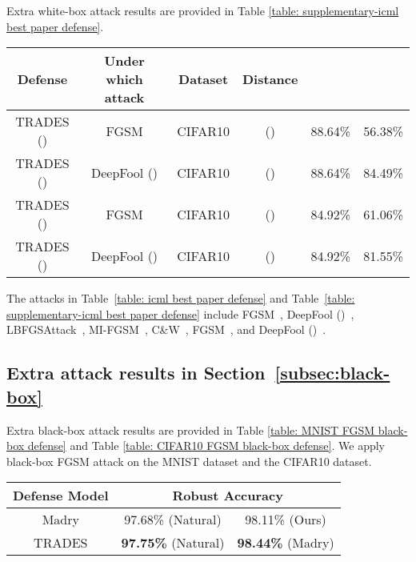 \documentclass[11pt]{article}
\newcommand{\0}{\mathbf{0}}
\newcommand{\1}{\mathbf{1}}
\begin{document}
Extra white-box attack results are provided in Table \ref{table: supplementary-icml best paper defense}.

\begin{table*}[ht]
	\caption{Results of our method TRADES under different white-box attacks.}
	\label{table: supplementary-icml best paper defense}
	\centering
\begin{tabular}{c||c|c|c|c|c}\hline
		Defense & Under which attack & Dataset & Distance &    &   
		\\
		\hline
		{TRADES} () & FGSM  & CIFAR10 &   () & 88.64\% & 56.38\% \\
{TRADES} () & DeepFool ()  & CIFAR10 &   () & 88.64\% & 84.49\% \\
\hline
		{TRADES} () & FGSM  & CIFAR10 &   () & 84.92\% & 61.06\% \\
{TRADES} ()  & DeepFool () & CIFAR10 &   () & 84.92\% & 81.55\% \\
\hline
	\end{tabular}
\end{table*}

The attacks in Table~\ref{table: icml best paper defense} and Table~\ref{table: supplementary-icml best paper defense} include FGSM~\cite{kurakin2016adversarial}, DeepFool ()~\cite{moosavi2016deepfool},  LBFGSAttack~\cite{tabacof2016exploring}, MI-FGSM~\cite{dong2018boosting}, C\&W~\cite{carlini2017towards}, FGSM~\cite{kurakin2016adversarial}, and DeepFool ()~\cite{moosavi2016deepfool}.

\subsection{Extra attack results in Section~\ref{subsec:black-box}}
Extra black-box attack results are provided in Table \ref{table: MNIST FGSM black-box defense} and Table \ref{table: CIFAR10 FGSM black-box defense}. We apply black-box FGSM attack on the MNIST dataset and the CIFAR10 dataset.


\begin{table*}[ht]
	\caption{Comparisons of TRADES with prior defense models under black-box FGSM attack on the MNIST dataset. The models inside parentheses are source models which provide gradients to adversarial attackers.}
	\label{table: MNIST FGSM black-box defense}
	\centering
\begin{tabular}{c||c|c}\hline
		Defense Model & \multicolumn{2}{c}{Robust Accuracy }
		\\
		\hline
		{Madry} & 97.68\% (Natural)  & 98.11\% (Ours) \\ 
		\hline
		{TRADES} & \textbf{97.75\%} (Natural) & \textbf{98.44\%} (Madry)  \\
		\hline
	\end{tabular}
\end{table*}
\end{document}
